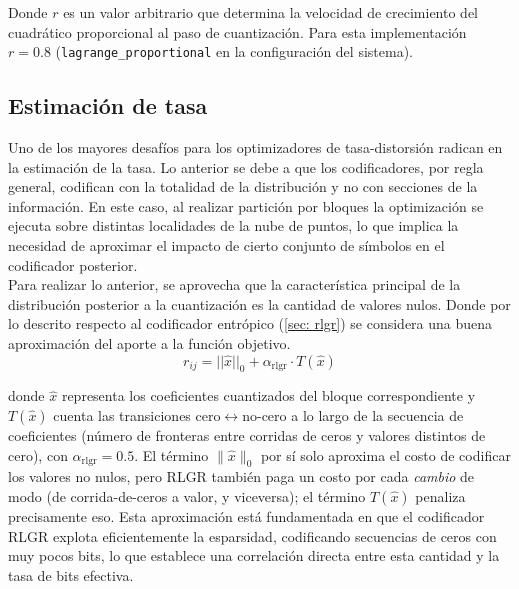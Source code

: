         Donde $r$ es un valor arbitrario que determina la velocidad de crecimiento del cuadrático proporcional al paso de cuantización. Para esta implementación $r=0.8$ (\texttt{lagrange\_proportional} en la configuración del sistema).
        
    \subsection{Estimación de tasa}
       Uno de los mayores desafíos para los optimizadores de tasa-distorsión radican en la estimación de la tasa. Lo anterior se debe a que los codificadores, por regla general, codifican con la totalidad de la distribución y no con secciones de la información. En este caso, al realizar partición por bloques la optimización se ejecuta sobre distintas localidades de la nube de puntos, lo que implica la necesidad de aproximar el impacto de cierto conjunto de símbolos en el codificador posterior.\\
    
       Para realizar lo anterior, se aprovecha que la característica principal de la distribución posterior a la cuantización es la cantidad de valores nulos. Donde por lo descrito respecto al codificador entrópico (\ref{sec: rlgr}) se considera una buena aproximación del aporte a la función objetivo. \\
    
       \begin{equation}
           r_{ij} = ||\hat{x}||_0 + \alpha_{\text{rlgr}} \cdot T(\hat{x})
       \end{equation}

       donde $\hat{x}$ representa los coeficientes cuantizados del bloque correspondiente y
       $T(\hat{x})$ cuenta las transiciones cero$\leftrightarrow$no-cero a lo largo de la
       secuencia de coeficientes (número de fronteras entre corridas de ceros y valores
       distintos de cero), con $\alpha_{\text{rlgr}}=0.5$. El término $\|\hat{x}\|_0$ por sí
       solo aproxima el costo de codificar los valores no nulos, pero RLGR también paga un
       costo por cada \emph{cambio} de modo (de corrida-de-ceros a valor, y viceversa); el
       término $T(\hat{x})$ penaliza precisamente eso. Esta aproximación está fundamentada en
       que el codificador RLGR explota eficientemente la esparsidad, codificando secuencias de
       ceros con muy pocos bits, lo que establece una correlación directa entre esta cantidad y
       la tasa de bits efectiva.\\
    
